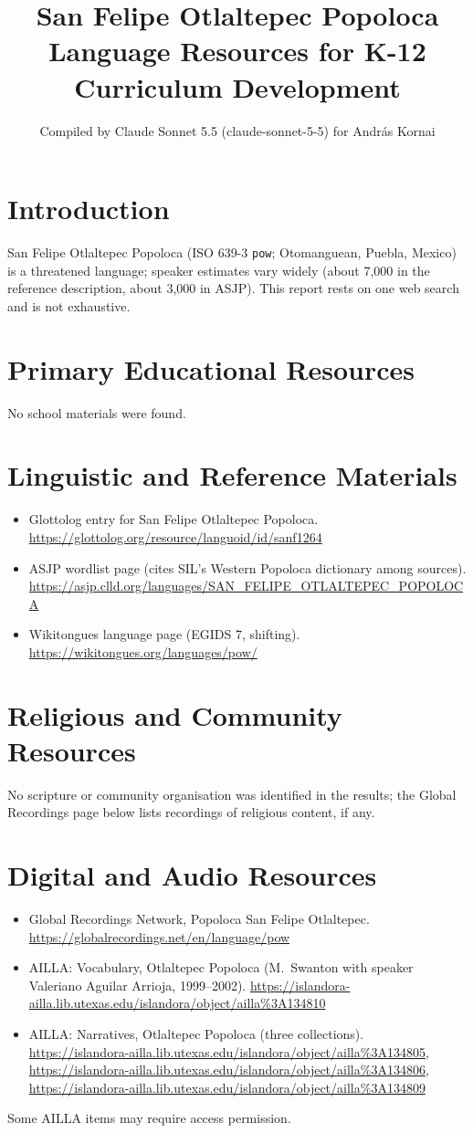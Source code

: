 \documentclass[12pt]{article}
\title{San Felipe Otlaltepec Popoloca Language Resources for K-12 Curriculum Development}
\author{Compiled by Claude Sonnet 5.5 (claude-sonnet-5-5) for Andr\'as Kornai}
\date{}
\begin{document}
\maketitle

\section{Introduction}
San Felipe Otlaltepec Popoloca (ISO 639-3 \texttt{pow}; Otomanguean, Puebla, Mexico) is a threatened language; speaker estimates vary widely (about 7,000 in the reference description, about 3,000 in ASJP). This report rests on one web search and is not exhaustive.

\section{Primary Educational Resources}
No school materials were found.

\section{Linguistic and Reference Materials}
\begin{itemize}
\item Glottolog entry for San Felipe Otlaltepec Popoloca. \url{https://glottolog.org/resource/languoid/id/sanf1264}
\item ASJP wordlist page (cites SIL's Western Popoloca dictionary among sources). \url{https://asjp.clld.org/languages/SAN_FELIPE_OTLALTEPEC_POPOLOCA}
\item Wikitongues language page (EGIDS 7, shifting). \url{https://wikitongues.org/languages/pow/}
\end{itemize}

\section{Religious and Community Resources}
No scripture or community organisation was identified in the results; the Global Recordings page below lists recordings of religious content, if any.

\section{Digital and Audio Resources}
\begin{itemize}
\item Global Recordings Network, Popoloca San Felipe Otlaltepec. \url{https://globalrecordings.net/en/language/pow}
\item AILLA: Vocabulary, Otlaltepec Popoloca (M.\ Swanton with speaker Valeriano Aguilar Arrioja, 1999--2002). \url{https://islandora-ailla.lib.utexas.edu/islandora/object/ailla%3A134810}
\item AILLA: Narratives, Otlaltepec Popoloca (three collections). \url{https://islandora-ailla.lib.utexas.edu/islandora/object/ailla%3A134805}, \url{https://islandora-ailla.lib.utexas.edu/islandora/object/ailla%3A134806}, \url{https://islandora-ailla.lib.utexas.edu/islandora/object/ailla%3A134809}
\end{itemize}
Some AILLA items may require access permission.
\end{document}
